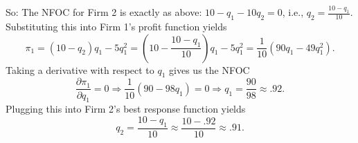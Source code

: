\begin{enumerate}
{So: The NFOC for Firm 2 is exactly as above: $10-q_1-10q_2=0$, i.e., $q_2=\frac{10-q_1}{10}$. Substituting this into Firm 1's profit function yields
\[
\pi_1=(10-q_2)q_1-5q_1^2=\left(10-\frac{10-q_1}{10}\right)q_1-5q_1^2=\frac{1}{10}(90q_1-49q_1^2).
\]
Taking a derivative with respect to $q_1$ gives us the NFOC
\[
\frac{\partial\pi_1}{\partial q_1}=0\Longrightarrow \frac{1}{10}(90-98q_1)=0\Longrightarrow q_1=\frac{90}{98}\approx .92.
\]
Plugging this into Firm 2's best response function yields
\[
q_2=\frac{10-q_1}{10}\approx\frac{10-.92}{10}\approx .91.
\]}

\end{enumerate}

